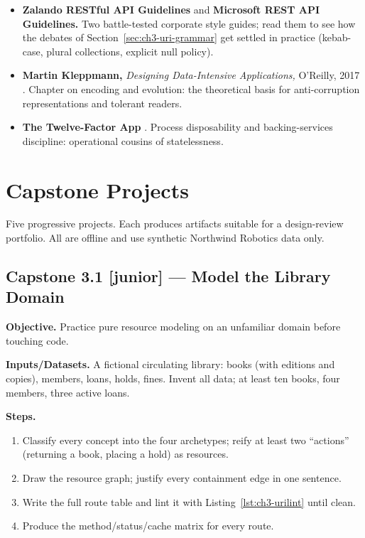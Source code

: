 \begin{itemize}
  \item \textbf{Zalando RESTful API Guidelines} and \textbf{Microsoft REST API
        Guidelines.} Two battle-tested corporate style guides; read them to see
        how the debates of Section~\ref{sec:ch3-uri-grammar} get settled in
        practice (kebab-case, plural collections, explicit null policy).
  \item \textbf{Martin Kleppmann,} \emph{Designing Data-Intensive Applications,}
        O'Reilly, 2017 \cite{kleppmann2017ddia}. Chapter on encoding and
        evolution: the theoretical basis for anti-corruption representations
        and tolerant readers.
  \item \textbf{The Twelve-Factor App} \cite{twelvefactor}. Process
        disposability and backing-services discipline: operational cousins of
        statelessness.
\end{itemize}

\section{Capstone Projects}
\label{sec:ch3-capstones}

Five progressive projects. Each produces artifacts suitable for a design-review
portfolio. All are offline and use synthetic Northwind Robotics data only.

\subsection{Capstone 3.1 [junior] --- Model the Library Domain}

\textbf{Objective.} Practice pure resource modeling on an unfamiliar domain
before touching code.

\textbf{Inputs/Datasets.} A fictional circulating library: books (with editions
and copies), members, loans, holds, fines. Invent all data; at least ten books,
four members, three active loans.

\textbf{Steps.}
\begin{enumerate}
  \item Classify every concept into the four archetypes; reify at least two
        ``actions'' (returning a book, placing a hold) as resources.
  \item Draw the resource graph; justify every containment edge in one
        sentence.
  \item Write the full route table and lint it with
        Listing~\ref{lst:ch3-urilint} until clean.
  \item Produce the method/status/cache matrix for every route.
\end{enumerate}

